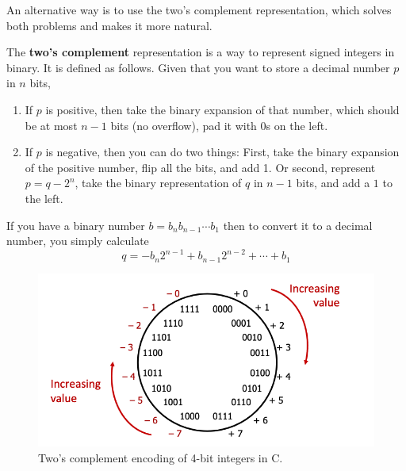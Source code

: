   An alternative way is to use the two's complement representation, which solves both problems and makes it more natural. 

  \begin{theorem}
    The \textbf{two's complement} representation is a way to represent signed integers in binary. It is defined as follows. Given that you want to store a decimal number $p$ in $n$ bits, 

    \begin{enumerate}
      \item If $p$ is positive, then take the binary expansion of that number, which should be at most $n-1$ bits (no overflow), pad it with $0$s on the left. 
      \item If $p$ is negative, then you can do two things: First, take the binary expansion of the positive number, flip all the bits, and add 1. Or second, represent $p = q - 2^n$, take the binary representation of $q$ in $n-1$ bits, and add a $1$ to the left. 
    \end{enumerate}
    If you have a binary number $b = b_{n}b_{n-1}\cdots b_1$ then to convert it to a decimal number, you simply calculate 
    \begin{equation}
      q = -b_{n}2^{n-1} + b_{n-1}2^{n-2} + \cdots + b_1
    \end{equation}
    \begin{figure}[H]
      \centering 
      \includegraphics[scale=0.4]{img/twos_complement_encoding.png}
      \caption{Two's complement encoding of 4-bit integers in C.} 
      \label{fig:twos_complement_encoding}
    \end{figure}
  \end{theorem}

